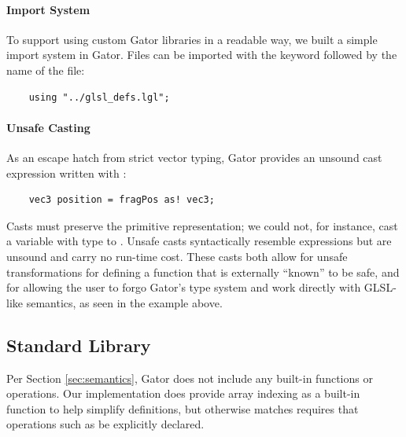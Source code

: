 \documentclass[../main.tex]{subfiles}
\begin{document}
{\paragraph{Import System}
To support using custom Gator libraries in a readable way, we built a simple import system in Gator.  Files can be imported with the keyword  followed by the name of the file:
%
\begin{lstlisting}
	using "../glsl_defs.lgl";
\end{lstlisting}
%
\paragraph{Unsafe Casting}
As an escape hatch from strict vector typing, Gator provides an unsound cast expression written with :
%
\begin{lstlisting}
	vec3 position = fragPos as! vec3;
\end{lstlisting}
%
Casts must preserve the primitive representation; we could not, for instance, cast a variable with type  to .
Unsafe casts syntactically resemble  expressions but are unsound and carry no run-time cost.
These casts both allow for unsafe transformations for defining a function that is externally ``known'' to be safe, and for allowing the user to forgo Gator's type system and work directly with GLSL-like semantics, as seen in the example above.

\subsection{Standard Library}
Per Section \ref{sec:semantics}, Gator does not include any built-in functions or operations.  Our implementation does provide array indexing as a built-in function to help simplify definitions, but otherwise matches requires that operations such as \code{+} be explicitly declared.

}
\end{document}
